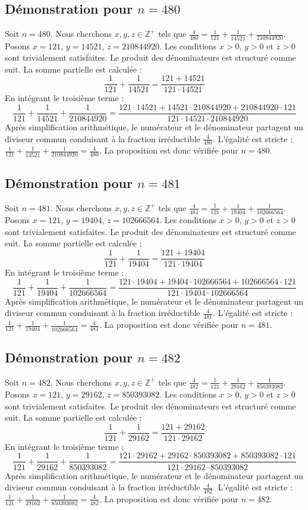 \documentclass[11pt,a4paper]{article}
\begin{document}
\subsection{Démonstration pour $n = 480$}
Soit $n = 480$. Nous cherchons $x, y, z \in \mathbb{Z}^{+}$ tels que $\frac{4}{480} = \frac{1}{121} + \frac{1}{14521} + \frac{1}{210844920}$.
Posons $x = 121$, $y = 14521$, $z = 210844920$.
Les conditions $x > 0$, $y > 0$ et $z > 0$ sont trivialement satisfaites.
Le produit des dénominateurs est structuré comme suit. La somme partielle est calculée :
$$ \frac{1}{121} + \frac{1}{14521} = \frac{121+14521}{121 \cdot 14521} $$
En intégrant le troisième terme :
$$ \frac{1}{121} + \frac{1}{14521} + \frac{1}{210844920} = \frac{121 \cdot 14521 + 14521 \cdot 210844920 + 210844920 \cdot 121}{121 \cdot 14521 \cdot 210844920} $$
Après simplification arithmétique, le numérateur et le dénominateur partagent un diviseur commun conduisant à la fraction irréductible $\frac{4}{480}$.
L'égalité est stricte : $\frac{1}{121} + \frac{1}{14521} + \frac{1}{210844920} = \frac{4}{480}$.
La proposition est donc vérifiée pour $n = 480$.
\subsection{Démonstration pour $n = 481$}
Soit $n = 481$. Nous cherchons $x, y, z \in \mathbb{Z}^{+}$ tels que $\frac{4}{481} = \frac{1}{121} + \frac{1}{19404} + \frac{1}{102666564}$.
Posons $x = 121$, $y = 19404$, $z = 102666564$.
Les conditions $x > 0$, $y > 0$ et $z > 0$ sont trivialement satisfaites.
Le produit des dénominateurs est structuré comme suit. La somme partielle est calculée :
$$ \frac{1}{121} + \frac{1}{19404} = \frac{121+19404}{121 \cdot 19404} $$
En intégrant le troisième terme :
$$ \frac{1}{121} + \frac{1}{19404} + \frac{1}{102666564} = \frac{121 \cdot 19404 + 19404 \cdot 102666564 + 102666564 \cdot 121}{121 \cdot 19404 \cdot 102666564} $$
Après simplification arithmétique, le numérateur et le dénominateur partagent un diviseur commun conduisant à la fraction irréductible $\frac{4}{481}$.
L'égalité est stricte : $\frac{1}{121} + \frac{1}{19404} + \frac{1}{102666564} = \frac{4}{481}$.
La proposition est donc vérifiée pour $n = 481$.
\subsection{Démonstration pour $n = 482$}
Soit $n = 482$. Nous cherchons $x, y, z \in \mathbb{Z}^{+}$ tels que $\frac{4}{482} = \frac{1}{121} + \frac{1}{29162} + \frac{1}{850393082}$.
Posons $x = 121$, $y = 29162$, $z = 850393082$.
Les conditions $x > 0$, $y > 0$ et $z > 0$ sont trivialement satisfaites.
Le produit des dénominateurs est structuré comme suit. La somme partielle est calculée :
$$ \frac{1}{121} + \frac{1}{29162} = \frac{121+29162}{121 \cdot 29162} $$
En intégrant le troisième terme :
$$ \frac{1}{121} + \frac{1}{29162} + \frac{1}{850393082} = \frac{121 \cdot 29162 + 29162 \cdot 850393082 + 850393082 \cdot 121}{121 \cdot 29162 \cdot 850393082} $$
Après simplification arithmétique, le numérateur et le dénominateur partagent un diviseur commun conduisant à la fraction irréductible $\frac{4}{482}$.
L'égalité est stricte : $\frac{1}{121} + \frac{1}{29162} + \frac{1}{850393082} = \frac{4}{482}$.
La proposition est donc vérifiée pour $n = 482$.
\end{document}
